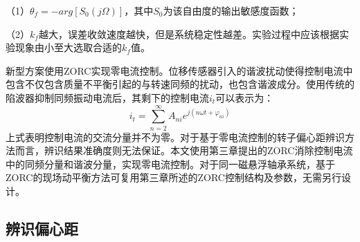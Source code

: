 \documentclass[
  lang=cn,
  degree=master,
  openany,oneside
]{nuaathesis}
\begin{document}
（1）$\theta _f = - arg\left[ S_0(j\Omega) \right]$，其中$S_0$为该自由度的输出敏感度函数；

（2）$k_f$越大，误差收敛速度越快，但是系统稳定性越差。实验过程中应该根据实验现象由小至大选取合适的$k_f$值。

新型方案使用ZORC实现零电流控制。位移传感器引入的谐波扰动使得控制电流中包含不仅包含质量不平衡引起的与转速同频的扰动，也包含谐波成分。使用传统的陷波器抑制同频振动电流后，其剩下的控制电流${i_t}$可以表示为：
\begin{equation}
	\label{eq:iz_0i_h}
	{i_t} = \sum\limits_{n = 2}^\infty  {{A_{ni}}{e^{j(n\omega t + {\varphi _{ni}})}}} 
\end{equation}
上式表明控制电流的交流分量并不为零。对于基于零电流控制的转子偏心距辨识方法而言，辨识结果准确度则无法保证。本文使用第三章提出的ZORC消除控制电流中的同频分量和谐波分量，实现零电流控制。对于同一磁悬浮轴承系统，基于ZORC的现场动平衡方法可复用第三章所述的ZORC控制结构及参数，无需另行设计。

\subsection{辨识偏心距}
\end{document}
